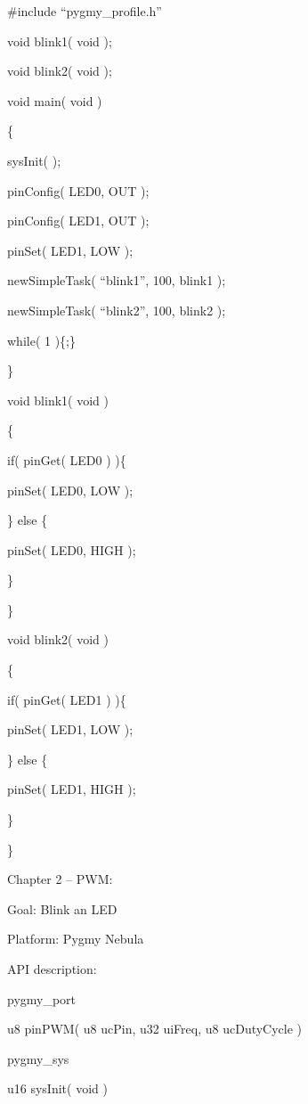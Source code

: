 \documentclass{article}
\begin{document}
\#include {\textquotedblleft}pygmy\_profile.h{\textquotedblright}


\bigskip

void blink1( void );

void blink2( void );


\bigskip

void main( void )

\{

sysInit( );

pinConfig( LED0, OUT );

pinConfig( LED1, OUT );

pinSet( LED1, LOW );

newSimpleTask( {\textquotedblleft}blink1{\textquotedblright}, 100, blink1 );

newSimpleTask( {\textquotedblleft}blink2{\textquotedblright}, 100, blink2 );


\bigskip

while( 1 )\{;\}

\}


\bigskip

void blink1( void )

\{

if( pinGet( LED0 ) )\{

pinSet( LED0, LOW );

\} else \{

pinSet( LED0, HIGH );

\}

\}


\bigskip

void blink2( void )

\{

if( pinGet( LED1 ) )\{

pinSet( LED1, LOW );

\} else \{

pinSet( LED1, HIGH );

\}

\}


\bigskip

Chapter 2 -- PWM:


\bigskip

Goal: Blink an LED

Platform: Pygmy Nebula

API description:

pygmy\_port

u8 pinPWM( u8 ucPin, u32 uiFreq, u8 ucDutyCycle )

pygmy\_sys

u16 sysInit( void )
\end{document}

